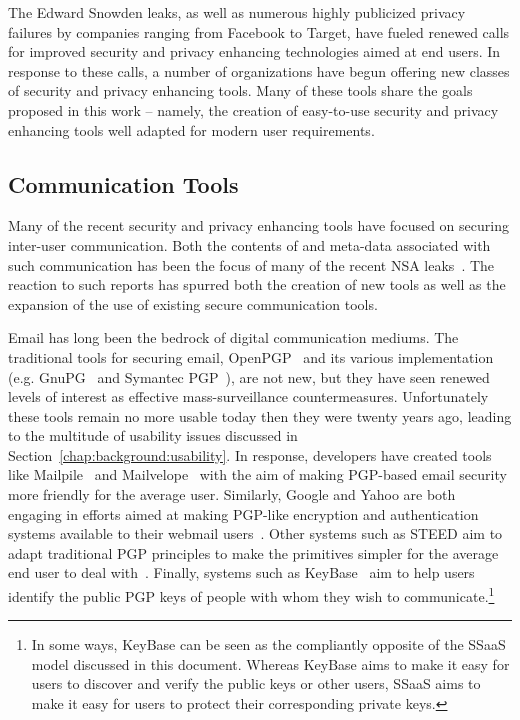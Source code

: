 The Edward Snowden leaks, as well as numerous highly publicized
privacy failures by companies ranging from Facebook to Target, have
fueled renewed calls for improved security and privacy enhancing
technologies aimed at end users. In response to these calls, a number
of organizations have begun offering new classes of security and
privacy enhancing tools. Many of these tools share the goals proposed
in this work -- namely, the creation of easy-to-use security and
privacy enhancing tools well adapted for modern user requirements.

\subsection{Communication Tools}

Many of the recent security and privacy enhancing tools have focused
on securing inter-user communication. Both the contents of and
meta-data associated with such communication has been the focus of
many of the recent NSA leaks~\cite{schneier-metadata}. The reaction to
such reports has spurred both the creation of new tools as well as the
expansion of the use of existing secure communication tools.

Email has long been the bedrock of digital communication mediums. The
traditional tools for securing email, OpenPGP~\cite{openpgp} and its
various implementation (e.g. GnuPG~\cite{gnupg} and Symantec
PGP~\cite{pgp}), are not new, but they have seen renewed levels of
interest as effective mass-surveillance countermeasures. Unfortunately
these tools remain no more usable today then they were twenty years
ago, leading to the multitude of usability issues discussed in
Section~\ref{chap:background:usability}. In response, developers have
created tools like Mailpile~\cite{mailpile} and
Mailvelope~\cite{mailvelope} with the aim of making PGP-based email
security more friendly for the average user. Similarly, Google and
Yahoo are both engaging in efforts aimed at making PGP-like encryption
and authentication systems available to their webmail
users~\cite{google-endtoend, yahoo-endtoend}. Other systems such as
STEED aim to adapt traditional PGP principles to make the primitives
simpler for the average end user to deal
with~\cite{koch2011}. Finally, systems such as KeyBase~\cite{keybase}
aim to help users identify the public PGP keys of people with whom
they wish to communicate.\footnote{In some ways, KeyBase can be seen
  as the compliantly opposite of the SSaaS model discussed in this
  document. Whereas KeyBase aims to make it easy for users to discover
  and verify the public keys or other users, SSaaS aims to make it
  easy for users to protect their corresponding private keys.}

